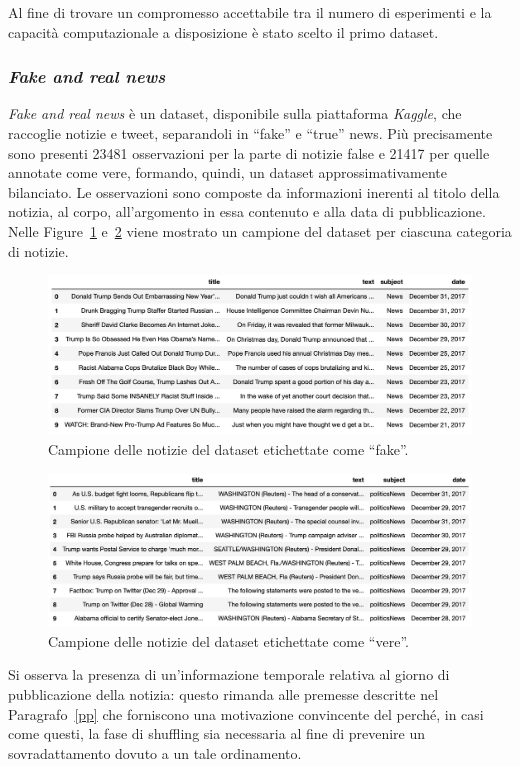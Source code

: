 \documentclass[12pt]{report}
\theoremstyle{definition}
\begin{document}
Al fine di trovare un compromesso accettabile tra il numero di esperimenti e la capacità computazionale a disposizione è stato scelto il primo dataset.

\subsubsection{\textit{Fake and real news}}\label{fakenewsdataset}
\textit{Fake and real news} è un dataset, disponibile sulla piattaforma \textit{Kaggle}, che raccoglie notizie e tweet, separandoli in ``fake'' e ``true'' news. Più precisamente sono presenti 23481 osservazioni per la parte di notizie false e 21417 per quelle annotate come vere, formando, quindi, un dataset approssimativamente bilanciato. 
Le osservazioni sono composte da informazioni inerenti al titolo della notizia, al corpo, all'argomento in essa contenuto e alla data di pubblicazione. Nelle Figure~\ref{fake_sample} e~\ref{true_sample} viene mostrato un campione del dataset per ciascuna categoria di notizie.
\begin{figure}
    \centering
    \includegraphics[scale=0.52]{images/fake_sample.png}
    \caption{Campione delle notizie del dataset etichettate come ``fake''.}
    \label{fake_sample}
\end{figure}
\begin{figure}
    \centering
    \includegraphics[scale=0.5]{images/true_sample.png}
    \caption{Campione delle notizie del dataset etichettate come ``vere''.}
    \label{true_sample}
\end{figure}
Si osserva la presenza di un'informazione temporale relativa al giorno di pubblicazione della notizia: questo rimanda alle premesse descritte nel Paragrafo~\ref{pp} che forniscono una motivazione convincente del perché, in casi come questi, la fase di shuffling sia necessaria al fine di prevenire un sovradattamento dovuto a un tale ordinamento.
\end{document}
